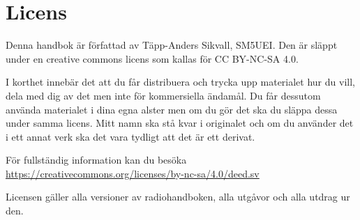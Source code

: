 \section*{Licens}

Denna handbok är författad av Täpp-Anders Sikvall, SM5UEI. Den är
släppt under en creative commons licens som kallas för CC BY-NC-SA 4.0.

I korthet innebär det att du får distribuera och trycka upp materialet
hur du vill, dela med dig av det men inte för kommersiella ändamål. Du
får dessutom använda materialet i dina egna alster men om du gör det
ska du släppa dessa under samma licens. Mitt namn ska stå kvar i
originalet och om du använder det i ett annat verk ska det vara
tydligt att det är ett derivat.

För fullständig information kan du besöka\\
\url{https://creativecommons.org/licenses/by-nc-sa/4.0/deed.sv}

Licensen gäller alla versioner av radiohandboken, alla utgåvor och
alla utdrag ur den.
